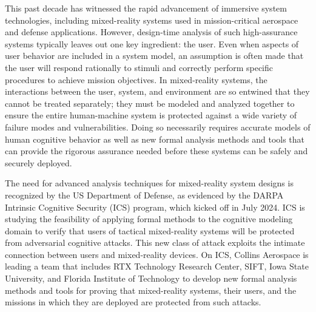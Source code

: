 This past decade has witnessed the rapid advancement of immersive system technologies, including mixed-reality systems used in mission-critical aerospace and defense applications. However, design-time analysis of such high-assurance systems typically leaves out one key ingredient: the user. Even when aspects of user behavior are included in a system model, an assumption is often made that the user will respond rationally to stimuli and correctly perform specific procedures to achieve mission objectives. In mixed-reality systems, the interactions between the user, system, and environment are so entwined that they cannot be treated separately; they must be modeled and analyzed together to ensure the entire human-machine system is protected against a wide variety of failure modes and vulnerabilities. Doing so necessarily requires accurate models of human cognitive behavior as well as new formal analysis methods and tools that can provide the rigorous assurance needed before these systems can be safely and securely deployed.

The need for advanced analysis techniques for mixed-reality system designs is recognized by the US Department of Defense, as evidenced by the DARPA Intrinsic Cognitive Security (ICS) program, which kicked off in July 2024. ICS is studying the feasibility of applying formal methods to the cognitive modeling domain to verify that users of tactical mixed-reality systems will be protected from adversarial cognitive attacks. This new class of attack exploits the intimate connection between users and mixed-reality devices. On ICS, Collins Aerospace is leading a team that includes RTX Technology Research Center, SIFT, Iowa State University, and Florida Institute of Technology to develop new formal analysis methods and tools for proving that mixed-reality systems, their users, and the missions in which they are deployed are protected from such attacks.

